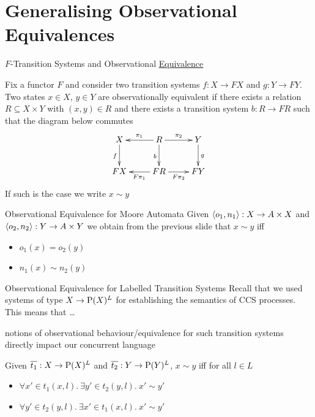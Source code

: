\documentclass[aspectratio=169]{beamer}
\begin{document}
\section{Generalising Observational Equivalences}

\begin{frame}{$F$-Transition Systems and Observational \underline{Equivalence}}

  \begin{definition}
    Fix a functor $F$ and consider two transition systems
    $f : X \to F X$ and $g : Y \to F Y$. Two states $x \in X$, $y \in Y$
    are observationally equivalent if there exists a relation
    $R \subseteq X \times Y$ with $(x,y) \in R$ and there exists a
    transition system $b : R \to FR$ such that the diagram below commutes
    \[
      \xymatrix{
        X \ar[d]_{f} & \ar[l]_{\pi_1}  R \ar[r]^{\pi_2} \ar[d]_{b} & Y \ar[d]^{g} \\
        F X  & \ar[l]^{F \pi_1} FR \ar[r]_{F \pi_2} & F Y
        }
    \]
    If such is the case we write \alert{$x \sim y$}  
  \end{definition}
\end{frame}

\begin{frame}{Observational Equivalence for Moore Automata}
  Given $\langle o_1, n_1 \rangle : X \to A \times X$ and
  $\langle o_2, n_2 \rangle : Y \to A \times Y$ we obtain from the previous slide 
  that $x \sim y$ iff
  \begin{itemize}
  \item $o_1(x) = o_2(y)$
  \item $n_1(x) \sim n_2(y)$
  \end{itemize}
\end{frame}

\begin{frame}{Observational Equivalence for Labelled Transition Systems}
  Recall that we used systems of type $X \to \mathrm{P}(X)^L$ for establishing the
  \alert{semantics} of \alert{CCS processes}. This means that \dots

  notions of observational behaviour/equivalence for such transition systems
  directly impact our concurrent language

  \vfill Given $\overline{t_1} : X \to \mathrm{P}(X)^L$ and
  $\overline{t_2} : Y \to \mathrm{P}(Y)^L$, $x \sim y$ iff for all $l \in L$
  \begin{itemize}
  \item $\forall x' \in t_1(x,l).\  \exists y' \in t_2(y,l).\ x' \sim y'$
  \item $\forall y' \in t_2(y,l).\ \exists x' \in t_1(x,l).\ x' \sim y'$
  \end{itemize}
\end{frame}



  
\end{document}
